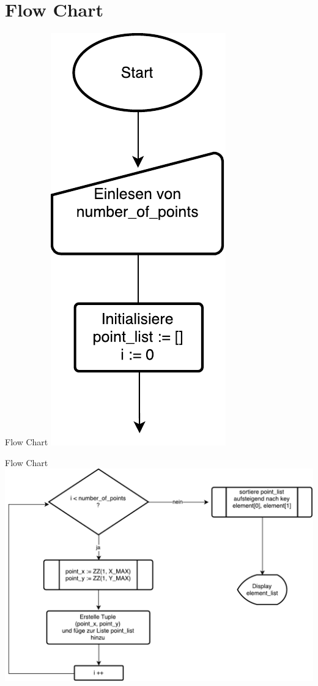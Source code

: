 \documentclass{beamer}
\begin{document}
\section{Flow Chart}
\begin{frame}{Flow Chart}
	\centering
  	\includegraphics[scale=0.4]{BSP03_Flow_Chart_1.pdf}
\end{frame}
\begin{frame}{Flow Chart}
	\centering
  	\includegraphics[scale=0.4]{BSP03_Flow_Chart_2.pdf}
\end{frame}
\end{document}
